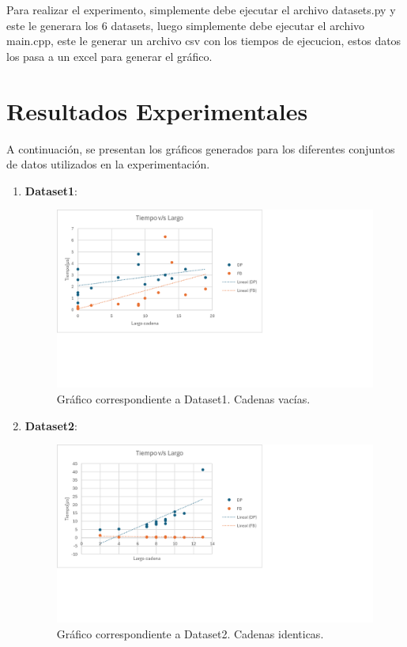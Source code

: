 Para realizar el experimento, simplemente debe ejecutar el archivo datasets.py y este le generara los 6 datasets, luego simplemente debe ejecutar el archivo main.cpp, este le generar un archivo csv con los tiempos de ejecucion, estos datos los pasa a un excel para generar el gráfico.

\section{Resultados Experimentales}

A continuación, se presentan los gráficos generados para los diferentes conjuntos de datos utilizados en la experimentación.

\begin{enumerate}
    \item \textbf{Dataset1}: 
    \begin{figure}[H]
        \centering
        \includegraphics[width=\textwidth]{tikz/Grafico1.png}
        \caption{Gráfico correspondiente a Dataset1. Cadenas vacías.}
        \label{fig:dataset1}
    \end{figure}

    \item \textbf{Dataset2}: 
    \begin{figure}[H]
        \centering
        \includegraphics[width=\textwidth]{tikz/Grafico2.png}
        \caption{Gráfico correspondiente a Dataset2. Cadenas identicas.}
        \label{fig:dataset2}
    \end{figure}


\end{enumerate}
